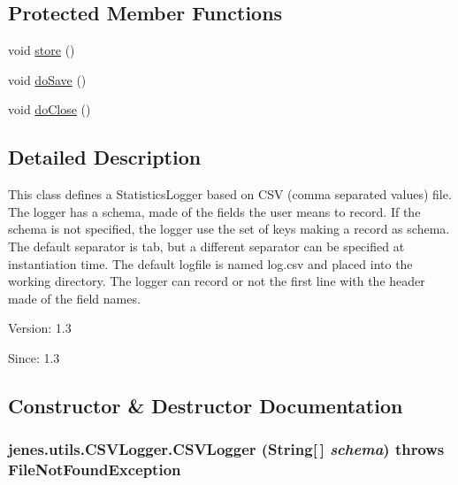 \subsection*{Protected Member Functions}
\begin{CompactItemize}
\item 
void \hyperlink{classjenes_1_1utils_1_1_c_s_v_logger_863bcfda3e93b023949a81e7f6d149e7}{store} ()
\item 
void \hyperlink{classjenes_1_1utils_1_1_c_s_v_logger_09a4f4fc362db6d4090d75642521ee65}{doSave} ()
\item 
void \hyperlink{classjenes_1_1utils_1_1_c_s_v_logger_c89f6fe5bd609fcc02ca7adf1407f279}{doClose} ()
\end{CompactItemize}


\subsection{Detailed Description}
This class defines a StatisticsLogger based on CSV (comma separated values) file. The logger has a schema, made of the fields the user means to record. If the schema is not specified, the logger use the set of keys making a record as schema. The default separator is tab, but a different separator can be specified at instantiation time. The default logfile is named log.csv and placed into the working directory. The logger can record or not the first line with the header made of the field names.

\begin{Desc}
\item[Version:]1.3 \end{Desc}
\begin{Desc}
\item[Since:]1.3 \end{Desc}


\subsection{Constructor \& Destructor Documentation}
\hypertarget{classjenes_1_1utils_1_1_c_s_v_logger_8cac9e217f74d86b4e26b025d8e1381c}{
\subsubsection[CSVLogger]{\setlength{\rightskip}{0pt plus 5cm}jenes.utils.CSVLogger.CSVLogger (String\mbox{[}$\,$\mbox{]} {\em schema})  throws FileNotFoundException }}
\label{classjenes_1_1utils_1_1_c_s_v_logger_8cac9e217f74d86b4e26b025d8e1381c}


